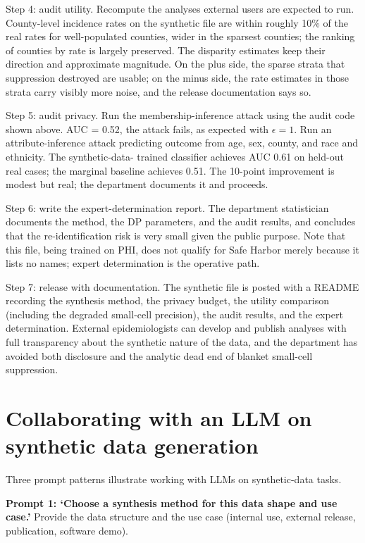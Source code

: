 \documentclass[
  letterpaper,
  11pt]{scrbook}
\begin{document}
Step 4: audit utility. Recompute the analyses external users are
expected to run. County-level incidence rates on the synthetic file are
within roughly 10\% of the real rates for well-populated counties, wider
in the sparsest counties; the ranking of counties by rate is largely
preserved. The disparity estimates keep their direction and approximate
magnitude. On the plus side, the sparse strata that suppression
destroyed are usable; on the minus side, the rate estimates in those
strata carry visibly more noise, and the release documentation says so.

Step 5: audit privacy. Run the membership-inference attack using the
audit code shown above. AUC = 0.52, the attack fails, as expected with
\(\epsilon = 1\). Run an attribute-inference attack predicting outcome
from age, sex, county, and race and ethnicity. The synthetic-data-
trained classifier achieves AUC 0.61 on held-out real cases; the
marginal baseline achieves 0.51. The 10-point improvement is modest but
real; the department documents it and proceeds.

Step 6: write the expert-determination report. The department
statistician documents the method, the DP parameters, and the audit
results, and concludes that the re-identification risk is very small
given the public purpose. Note that this file, being trained on PHI,
does not qualify for Safe Harbor merely because it lists no names;
expert determination is the operative path.

Step 7: release with documentation. The synthetic file is posted with a
README recording the synthesis method, the privacy budget, the utility
comparison (including the degraded small-cell precision), the audit
results, and the expert determination. External epidemiologists can
develop and publish analyses with full transparency about the synthetic
nature of the data, and the department has avoided both disclosure and
the analytic dead end of blanket small-cell suppression.

\section{Collaborating with an LLM on synthetic data
generation}\label{collaborating-with-an-llm-on-synthetic-data-generation}

Three prompt patterns illustrate working with LLMs on synthetic-data
tasks.

\textbf{Prompt 1: `Choose a synthesis method for this data shape and use
case.'} Provide the data structure and the use case (internal use,
external release, publication, software demo).
\end{document}
